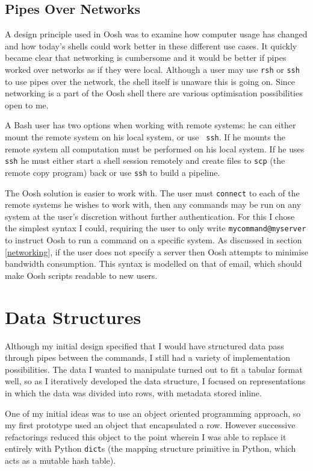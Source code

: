 \documentclass[12pt,twoside,notitlepage]{report}
\begin{document}
\subsection{Pipes Over Networks}

A design principle used in Oosh was to examine how computer usage has
changed and how today's shells could work better in these different
use cases. It quickly became clear that networking is cumbersome and
it would be better if pipes worked over networks as if they were
local. Although a user may use {\tt rsh} or {\tt ssh} to use pipes
over the network, the shell itself is unaware this is going on. Since
networking is a part of the Oosh shell there are various optimisation
possibilities open to me.

A Bash user has two options when working with remote systems: he can
either mount the remote system on his local system, or use {\tt
  ssh}. If he mounts the remote system all computation must be
performed on his local system. If he uses {\tt ssh} he must either
start a shell session remotely and create files to {\tt scp} (the
remote copy program) back or use {\tt ssh} to build a pipeline.

The Oosh solution is easier to work with. The user must {\tt connect}
to each of the remote systems he wishes to work with, then any
commands may be run on any system at the user's discretion without
further authentication. For this I chose the simplest syntax I could,
requiring the user to only write {\tt mycommand@myserver} to instruct
Oosh to run a command on a specific system. As discussed in section
\ref{networking}, if the user does not specify a server then Oosh
attempts to minimise bandwidth consumption. This syntax is modelled on
that of email, which should make Oosh scripts readable to new users.

\section{Data Structures}
Although my initial design specified that I would have structured data
pass through pipes between the commands, I still had a variety of
implementation possibilities. The data I wanted to manipulate turned
out to fit a tabular format well, so as I iteratively developed the
data structure, I focused on representations in which the data was
divided into rows, with metadata stored inline.

One of my initial ideas was to use an object oriented programming
approach, so my first prototype used an object that encapsulated a
row. However successive refactorings reduced this object to the point
wherein I was able to replace it entirely with Python {\tt dict}s (the
mapping structure primitive in Python, which acts as a mutable hash
table).
\end{document}
